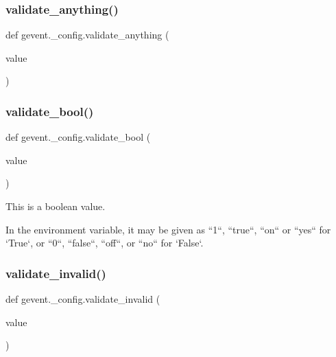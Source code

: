 \subsubsection{\texorpdfstring{validate\+\_\+anything()}{validate\_anything()}}
{\footnotesize\ttfamily def gevent.\+\_\+config.\+validate\+\_\+anything (\begin{DoxyParamCaption}\item[{}]{value }\end{DoxyParamCaption})}

\mbox{\label{namespacegevent_1_1__config_a4c6aaec72970a8735546a459131ad32c}} 
\subsubsection{\texorpdfstring{validate\+\_\+bool()}{validate\_bool()}}
{\footnotesize\ttfamily def gevent.\+\_\+config.\+validate\+\_\+bool (\begin{DoxyParamCaption}\item[{}]{value }\end{DoxyParamCaption})}

\begin{DoxyVerb}This is a boolean value.

In the environment variable, it may be given as ``1``, ``true``,
``on`` or ``yes`` for `True`, or ``0``, ``false``, ``off``, or
``no`` for `False`.
\end{DoxyVerb}
 \mbox{\label{namespacegevent_1_1__config_aa9582466c42175e3f56973a1ee5998da}} 
\subsubsection{\texorpdfstring{validate\+\_\+invalid()}{validate\_invalid()}}
{\footnotesize\ttfamily def gevent.\+\_\+config.\+validate\+\_\+invalid (\begin{DoxyParamCaption}\item[{}]{value }\end{DoxyParamCaption})}



